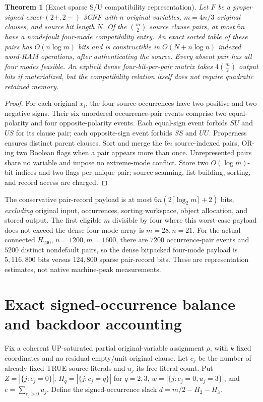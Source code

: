 \documentclass[10pt]{article}
\newtheorem{theorem}{Theorem}
\begin{document}
\begin{theorem}[Exact sparse S/U compatibility representation]
Let $F$ be a proper signed exact-$(2+,2-)$ 3CNF with $n$ original variables, $m=4n/3$ original clauses, and source bit length $N$. Of the $\binom m2$ source clause pairs, at most $6n$ have a nondefault four-mode compatibility entry. An exact sorted table of these pairs has $O(n\log m)$ bits and is constructible in $O(N+n\log n)$ indexed word-RAM operations, after authenticating the source. Every absent pair has all four modes feasible. An explicit dense four-bit-per-pair matrix takes $4\binom m2$ output bits if materialized, but the compatibility relation itself does not require quadratic retained memory.
\end{theorem}
\begin{proof}
For each original $x_i$, the four source occurrences have two positive and two negative signs. Their six unordered occurrence-pair events comprise two equal-polarity and four opposite-polarity events. Each equal-sign event forbids $SU$ and $US$ for its clause pair; each opposite-sign event forbids $SS$ and $UU$. Properness ensures distinct parent clauses. Sort and merge the $6n$ source-indexed pairs, OR-ing two Boolean flags when a pair appears more than once. Unrepresented pairs share no variable and impose no extreme-mode conflict. Store two $O(\log m)$-bit indices and two flags per unique pair; source scanning, list building, sorting, and record access are charged.
\end{proof}
The conservative pair-record payload is at most $6n(2\lceil\log_2m\rceil+2)$ bits, \emph{excluding} original input, occurrences, sorting workspace, object allocation, and stored output. The first eligible $m$ divisible by four where this worst-case payload does not exceed the dense four-mode array is $m=28,n=21$. For the actual connected $H_{200}$, $n=1200,m=1600$, there are $7200$ occurrence-pair events and $5200$ distinct nondefault pairs, so the dense bitpacked four-mode payload is $5{,}116{,}800$ bits versus $124{,}800$ sparse pair-record bits. These are representation estimates, not native machine-peak measurements.

\section*{Exact signed-occurrence balance and backdoor accounting}
Fix a coherent UP-saturated partial original-variable assignment $\rho$, with $k$ fixed coordinates and no residual empty/unit original clause. Let $c_j$ be the number of already fixed-TRUE source literals and $u_j$ its free literal count. Put $Z=|\{j:c_j=0\}|$, $H_q=|\{j:c_j=q\}|$ for $q=2,3$, $w=|\{j:c_j=0,u_j=3\}|$, and $e=\sum_{c_j>0}u_j$. Define the signed-occurrence slack $d=m/2-H_2-H_3$.
\end{document}
